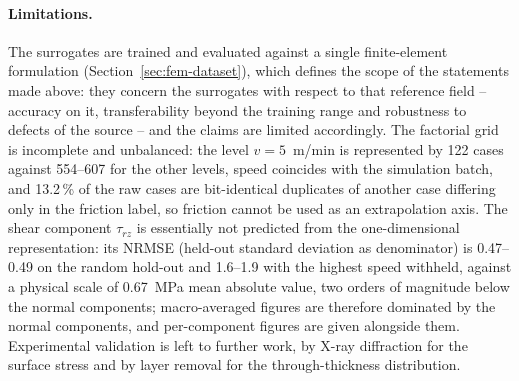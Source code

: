 \paragraph{Limitations.}
The surrogates are trained and evaluated against a single finite-element formulation (Section~\ref{sec:fem-dataset}), which defines the scope of the statements made above: they concern the surrogates with respect to that reference field -- accuracy on it, transferability beyond the training range and robustness to defects of the source -- and the claims are limited accordingly. %
The factorial grid is incomplete and unbalanced: the level $v = 5$~m/min is represented by 122 cases against 554--607 for the other levels, speed coincides with the simulation batch, and 13.2\,\% of the raw cases are bit-identical duplicates of another case differing only in the friction label, so friction cannot be used as an extrapolation axis. %
The shear component $\tau_{rz}$ is essentially not predicted from the one-dimensional representation: its NRMSE (held-out standard deviation as denominator) is 0.47--0.49 on the random hold-out and 1.6--1.9 with the highest speed withheld, against a physical scale of 0.67~MPa mean absolute value, two orders of magnitude below the normal components; macro-averaged figures are therefore dominated by the normal components, and per-component figures are given alongside them. %
Experimental validation is left to further work, by X-ray diffraction for the surface stress and by layer removal for the through-thickness distribution. %